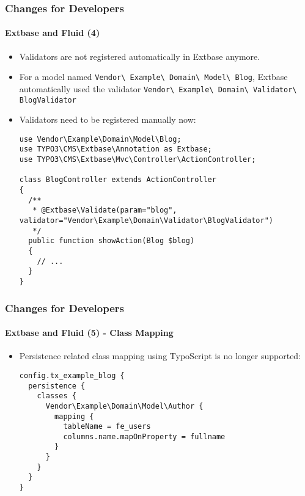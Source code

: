 \begin{frame}[fragile]
	\frametitle{Changes for Developers}
	\framesubtitle{Extbase and Fluid (4)}

	\lstset{basicstyle=\tiny\ttfamily}

	\begin{itemize}
		\item Validators are not registered automatically in Extbase anymore.
		\item For a model named
			\small\texttt{Vendor\textbackslash
				Example\textbackslash
				Domain\textbackslash
				Model\textbackslash
				Blog}\normalsize,\newline
			Extbase automatically used the validator
			\small\texttt{Vendor\textbackslash
				Example\textbackslash
				Domain\textbackslash
				Validator\textbackslash
				BlogValidator}\normalsize

		\item Validators need to be registered manually now:

\begin{lstlisting}
use Vendor\Example\Domain\Model\Blog;
use TYPO3\CMS\Extbase\Annotation as Extbase;
use TYPO3\CMS\Extbase\Mvc\Controller\ActionController;

class BlogController extends ActionController
{
  /**
   * @Extbase\Validate(param="blog", validator="Vendor\Example\Domain\Validator\BlogValidator")
   */
  public function showAction(Blog $blog)
  {
    // ...
  }
}
\end{lstlisting}

	\end{itemize}

\end{frame}


\begin{frame}[fragile]
	\frametitle{Changes for Developers}
	\framesubtitle{Extbase and Fluid (5) - Class Mapping}

	\lstset{basicstyle=\tiny\ttfamily}

	\begin{itemize}
		\item Persistence related class mapping using TypoScript is no longer supported:

\begin{lstlisting}
config.tx_example_blog {
  persistence {
    classes {
      Vendor\Example\Domain\Model\Author {
        mapping {
          tableName = fe_users
          columns.name.mapOnProperty = fullname
        }
      }
    }
  }
}
\end{lstlisting}

	\end{itemize}

\end{frame}

